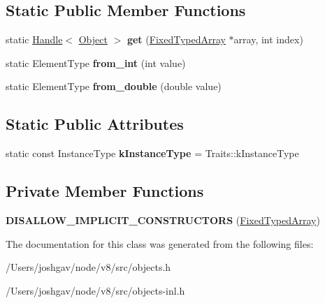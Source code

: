 \subsection*{Static Public Member Functions}
\begin{DoxyCompactItemize}
\item 
static \hyperlink{classv8_1_1internal_1_1_handle}{Handle}$<$ \hyperlink{classv8_1_1internal_1_1_object}{Object} $>$ {\bfseries get} (\hyperlink{classv8_1_1internal_1_1_fixed_typed_array}{Fixed\+Typed\+Array} $\ast$array, int index)\hypertarget{classv8_1_1internal_1_1_fixed_typed_array_ab517dce4cfba721f917a595a590631b9}{}\label{classv8_1_1internal_1_1_fixed_typed_array_ab517dce4cfba721f917a595a590631b9}

\item 
static Element\+Type {\bfseries from\+\_\+int} (int value)\hypertarget{classv8_1_1internal_1_1_fixed_typed_array_a7272e38ae262442c1d512fd40400b8bd}{}\label{classv8_1_1internal_1_1_fixed_typed_array_a7272e38ae262442c1d512fd40400b8bd}

\item 
static Element\+Type {\bfseries from\+\_\+double} (double value)\hypertarget{classv8_1_1internal_1_1_fixed_typed_array_ad6a083f76c0290b768254c74fc5b6cf1}{}\label{classv8_1_1internal_1_1_fixed_typed_array_ad6a083f76c0290b768254c74fc5b6cf1}

\end{DoxyCompactItemize}
\subsection*{Static Public Attributes}
\begin{DoxyCompactItemize}
\item 
static const Instance\+Type {\bfseries k\+Instance\+Type} = Traits\+::k\+Instance\+Type\hypertarget{classv8_1_1internal_1_1_fixed_typed_array_accd010801011ae37d64c0314f264cb0b}{}\label{classv8_1_1internal_1_1_fixed_typed_array_accd010801011ae37d64c0314f264cb0b}

\end{DoxyCompactItemize}
\subsection*{Private Member Functions}
\begin{DoxyCompactItemize}
\item 
{\bfseries D\+I\+S\+A\+L\+L\+O\+W\+\_\+\+I\+M\+P\+L\+I\+C\+I\+T\+\_\+\+C\+O\+N\+S\+T\+R\+U\+C\+T\+O\+RS} (\hyperlink{classv8_1_1internal_1_1_fixed_typed_array}{Fixed\+Typed\+Array})\hypertarget{classv8_1_1internal_1_1_fixed_typed_array_a8a40c99735fbfad2dab191eefbebccd9}{}\label{classv8_1_1internal_1_1_fixed_typed_array_a8a40c99735fbfad2dab191eefbebccd9}

\end{DoxyCompactItemize}


The documentation for this class was generated from the following files\+:\begin{DoxyCompactItemize}
\item 
/\+Users/joshgav/node/v8/src/objects.\+h\item 
/\+Users/joshgav/node/v8/src/objects-\/inl.\+h\end{DoxyCompactItemize}
